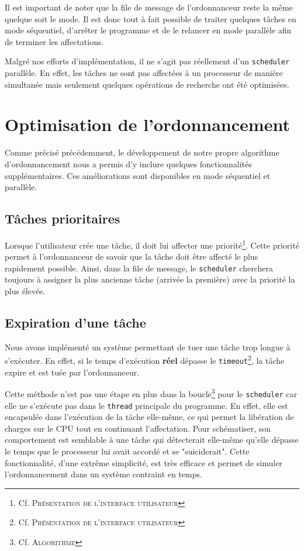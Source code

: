     Il est important de noter que la file de message de l'ordonnanceur reste la même quelque soit le mode. Il est donc tout à fait possible de traiter quelques tâches en mode séquentiel, d'arrêter le programme et de le relancer en mode parallèle afin de terminer les affectations.\newline
     
    Malgré nos efforts d'implémentation, il ne s'agit pas réellement d'un \texttt{scheduler} parallèle. En effet, les tâches ne sont pas affectées à un processeur de manière simultanée mais seulement quelques opérations de recherche ont été optimisées.
    
    \section{Optimisation de l'ordonnancement}
    
    Comme précisé précédemment, le développement de notre propre algorithme d'ordonnancement nous a permis d'y inclure quelques fonctionnalités supplémentaires. Ces améliorations sont disponibles en mode séquentiel et parallèle.
    
    \subsection{Tâches prioritaires}
    
    Lorsque l'utilisateur crée une tâche, il doit lui affecter une priorité\footnote{Cf. \textsc{Présentation de l'interface utilisateur}}. Cette priorité permet à l'ordonnanceur de savoir que la tâche doit être affecté le plus rapidement possible. Ainsi, dans la file de message, le \texttt{scheduler} cherchera toujours à assigner la plus ancienne tâche (arrivée la première) avec la priorité la plus élevée.
    
    \subsection{Expiration d'une tâche}
    
    Nous avons implémenté un système permettant de tuer une tâche trop longue à s'exécuter. En effet, si le temps d'exécution \textbf{réel} dépasse le \texttt{timeout}\footnote{Cf. \textsc{Présentation de l'interface utilisateur}}, la tâche expire et est tuée par l'ordonnanceur. \newline
    
    Cette méthode n'est pas une étape en plus dans la boucle\footnote{Cf. \textsc{Algorithme}} pour le \texttt{scheduler} car elle ne s'exécute pas dans le \texttt{thread} principale du programme. En effet,  elle est encapsulée dans l'exécution de la tâche elle-même, ce qui permet la libération de charges sur le CPU tout en continuant l'affectation. Pour schématiser, son comportement est semblable à une tâche qui détecterait elle-même qu'elle dépasse le temps que le processeur lui avait accordé et se "suiciderait".  Cette fonctionnalité, d'une extrême simplicité, est très efficace et permet de simuler l'ordonnancement dans un système contraint en temps.
    
